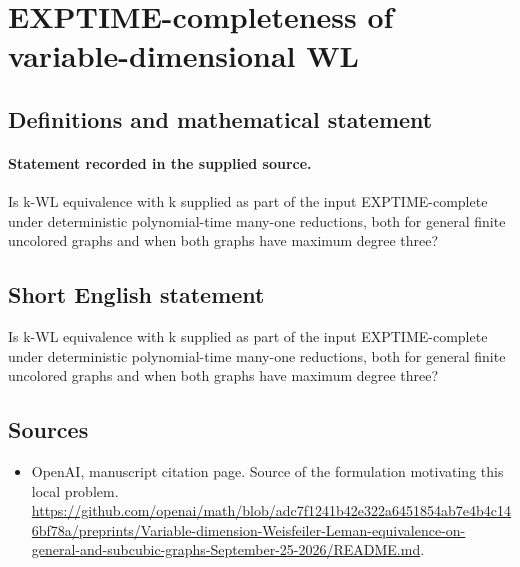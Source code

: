 \documentclass[11pt]{article}
\begin{document}
\section*{EXPTIME-completeness of variable-dimensional WL}\label{statement}
\subsection{Definitions and mathematical statement}
\paragraph{Statement recorded in the supplied source.}
Is k-WL equivalence with k supplied as part of the input EXPTIME-complete under deterministic polynomial-time many-one reductions, both for general finite uncolored graphs and when both graphs have maximum degree three?
\subsection{Short English statement}
Is k-WL equivalence with k supplied as part of the input EXPTIME-complete under deterministic polynomial-time many-one reductions, both for general finite uncolored graphs and when both graphs have maximum degree three?
\subsection{Sources}
\begin{itemize}
\item[S1] OpenAI, manuscript citation page. Source of the formulation motivating this local problem.
\url{https://github.com/openai/math/blob/adc7f1241b42e322a6451854ab7e4b4c146bf78a/preprints/Variable-dimension-Weisfeiler-Leman-equivalence-on-general-and-subcubic-graphs-September-25-2026/README.md}.
\end{itemize}
\end{document}
